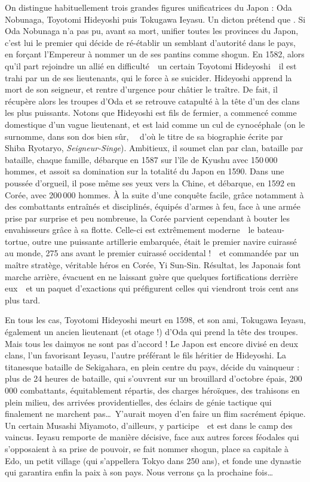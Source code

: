 On distingue habituellement trois grandes figures unificatrices du Japon : Oda
Nobunaga, Toyotomi Hideyoshi puis Tokugawa Ieyasu. Un dicton prétend que
. Si Oda Nobunaga n'a pas pu, avant sa mort, unifier
toutes les provinces du Japon, c'est lui le premier qui décide de ré-établir un
semblant d'autorité dans le pays, en forçant l'Empereur à nommer un de ses
pantins comme shogun. En 1582, alors qu'il part rejoindre un allié en
difficulté~\incise~un certain Toyotomi Hideyoshi~\incise~il est trahi par un de
ses lieutenants, qui le force à se suicider. Hideyoshi apprend la mort de son
seigneur, et rentre d'urgence pour châtier le traître. De fait, il récupère
alors les troupes d'Oda et se retrouve catapulté à la tête d'un des clans les
plus puissants. Notons que Hideyoshi est fils de fermier, a commencé comme
domestique d'un vague lieutenant, et est laid comme un cul de cynocéphale (on
le surnomme, dans son dos bien sûr, ~\incise~d'où le titre
de sa biographie écrite par Shiba Ryotaryo, \emph{Seigneur-Singe}). Ambitieux,
il soumet clan par clan, bataille par bataille, chaque famille, débarque en
1587 sur l'île de Kyushu avec 150\,000 hommes, et assoit sa domination sur la
totalité du Japon en 1590. Dans une poussée d'orgueil, il pose même ses yeux
vers la Chine, et débarque, en 1592 en Corée, avec 200\,000 hommes. À la suite
d'une conquête facile, grâce notamment à des combattants entraînés et
disciplinés, équipés d'armes à feu, face à une armée prise par surprise et peu
nombreuse, la Corée parvient cependant à bouter les envahisseurs grâce à sa
flotte. Celle-ci est extrêmement moderne~\incise~le bateau-tortue, outre une
puissante artillerie embarquée, était le premier navire cuirassé au monde, 275
ans avant le premier cuirassé occidental !~\incise~et commandée par un maître
stratège, véritable héros en Corée, Yi Sun-Sin. Résultat, les Japonais font
marche arrière, évacuent en ne laissant guère que quelques fortifications
derrière eux~\incise~et un paquet d'exactions qui préfigurent celles qui
viendront trois cent ans plus tard.

En tous les cas, Toyotomi Hideyoshi meurt en 1598, et son ami, Tokugawa Ieyasu,
également un ancien lieutenant (et otage !) d'Oda qui prend la tête des
troupes. Mais tous les daimyos ne sont pas d'accord ! Le Japon est encore
divisé en deux clans, l'un favorisant Ieyasu, l'autre préférant le fils
héritier de Hideyoshi.  La titanesque bataille de Sekigahara, en plein centre
du pays, décide du vainqueur : plus de 24 heures de bataille, qui s'ouvrent sur
un brouillard d'octobre épais, 200\,000 combattants, équitablement répartis,
des charges héroïques, des trahisons en plein milieu, des arrivées
providentielles, des éclairs de génie tactique qui finalement ne marchent
pas\dots\ Y'aurait moyen d'en faire un flim sacrément épique. Un certain
Musashi Miyamoto, d'ailleurs, y participe~\incise~et est dans le camp des
vaincus. Ieyasu remporte de manière décisive, face aux autres forces féodales
qui s'opposaient à sa prise de pouvoir, se fait nommer shogun, place sa
capitale à Edo, un petit village (qui s'appellera Tokyo dans 250 ans), et fonde
une dynastie qui garantira enfin la paix à son pays. Nous verrons ça la
prochaine fois\dots
